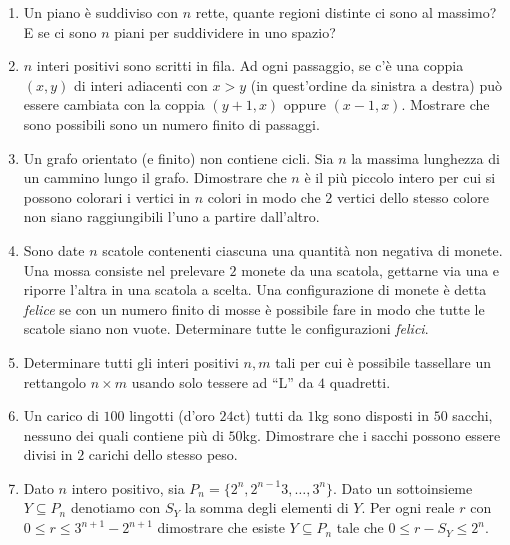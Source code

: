 \documentclass[a4paper,10pt]{article}
\begin{document}
\begin{enumerate}
	Nel mese di gennaio, lo gnomo Gennaio va a trovare tutti i suoi amici.  Se nota che la maggioranza stretta dei suoi amici ha la casetta di un colore diverso dalla sua, allora entro la fine del mese egli ridipinge la sua casetta, cambiando il colore per ``adeguarsi alla maggioranza degli altri''.

	Nel mese di febbraio, tocca allo gnome Febbraio fare visita ai suoi amici ed eventualmente ridipingere la casetta per ``adeguarsi alla maggioranza'', e cos\`{\i} via.

	Questa procedura si ripete di anno in anno.  Si dimostri che, da un certo momento in poi, nessuno gnomo avr\`{a} pi\`{u} bisogno di ridipingere la sua casetta (si supponga l'amicizia simmetrica, e che ogni gnomo non includa se stesso nella lista dei suoi amici).

	\item Un piano è suddiviso con $n$ rette, quante regioni distinte ci sono al massimo? E se ci sono $n$ piani per suddividere in uno spazio?

	\item $n$ interi positivi sono scritti in fila. Ad ogni passaggio, se c'\`e una coppia $(x,y)$ di interi adiacenti con $x>y$ (in quest'ordine da sinistra a destra) pu\`o essere cambiata con la coppia $(y+1,x)$ oppure $(x-1,x)$. Mostrare che sono possibili sono un numero finito di passaggi.

	\item Un grafo orientato (e finito) non contiene cicli. Sia $n$ la massima lunghezza di un cammino lungo il grafo. Dimostrare che $n$ \`e il pi\`u piccolo intero per cui si possono colorari i vertici in $n$ colori in modo che $2$ vertici dello stesso colore non siano raggiungibili l'uno a partire dall'altro.

	\item Sono date $n$ scatole contenenti ciascuna una quantit\`a non negativa di monete. Una mossa consiste nel prelevare $2$ monete da una scatola, gettarne via una e riporre l'altra in una scatola a scelta. Una configurazione di monete \`e detta \textit{felice} se con un numero finito di mosse \`e possibile fare in modo che tutte le scatole siano non vuote. Determinare tutte le configurazioni \textit{felici}.
	
	\item Determinare tutti gli interi positivi $n,m$ tali per cui \`e possibile tassellare un rettangolo $n \times m$ usando solo tessere ad ``L'' da $4$ quadretti.

	\item Un carico di $100$ lingotti (d'oro $24$ct) tutti da $1$kg sono disposti in $50$ sacchi, nessuno dei quali contiene pi\`u di $50$kg. Dimostrare che i sacchi possono essere divisi in $2$ carichi dello stesso peso.

	\item Dato $n$ intero positivo, sia $P_n=\{2^n,2^{n-1}3,\dots,3^n\}$. Dato un sottoinsieme $Y\subseteq P_n$ denotiamo con $S_Y$ la somma degli elementi di $Y$. Per ogni reale $r$ con $0\leq r \leq 3^{n+1} -	2^{n+1}$ dimostrare che esiste $Y\subseteq P_n$ tale che $0\leq r-S_Y \leq 2^n$.

\end{enumerate}
\bigskip\bigskip
\end{document}
